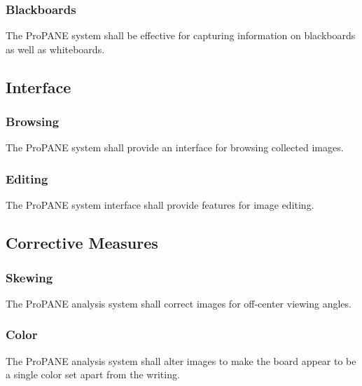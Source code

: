 \documentclass[]{article}
\begin{document}
			\subsubsection{Blackboards}
				The ProPANE system shall be effective for capturing information on blackboards as well as whiteboards. 
			
		\subsection{Interface}
		
			\subsubsection{Browsing}
				The ProPANE system shall provide an interface for browsing collected images.
				
			\subsubsection{Editing}
				The ProPANE system interface shall provide features for image editing.
		
		\subsection{Corrective Measures}
			
			\subsubsection{Skewing}
				The ProPANE analysis system shall correct images for off-center viewing angles.
				
			\subsubsection{Color}
				The ProPANE analysis system shall alter images to make the board appear to be a single color set apart from the writing.
		
\end{document}
